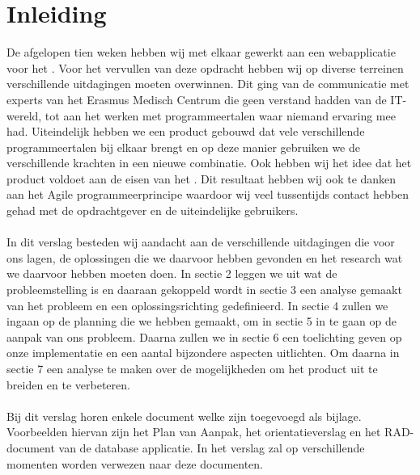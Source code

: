 \section{Inleiding}
\label{inleiding}
De afgelopen tien weken hebben wij met elkaar gewerkt aan een webapplicatie voor het \casamproject. 
Voor het vervullen van deze opdracht hebben wij op diverse terreinen verschillende uitdagingen moeten overwinnen. 
Dit ging van de communicatie met experts van het Erasmus Medisch Centrum die geen verstand hadden van de IT-wereld, tot aan het werken met programmeertalen waar niemand ervaring mee had. 
Uiteindelijk hebben we een product gebouwd dat vele verschillende programmeertalen bij elkaar brengt en op deze manier gebruiken we de verschillende krachten in een nieuwe combinatie. 
Ook hebben wij het idee dat het product voldoet aan de eisen van het \casamproject. 
Dit resultaat hebben wij ook te danken aan het Agile programmeerprincipe waardoor wij veel tussentijds contact hebben gehad met de opdrachtgever en de uiteindelijke gebruikers.
\\
\\
In dit verslag besteden wij aandacht aan de verschillende uitdagingen die voor ons lagen, de oplossingen die we daarvoor hebben gevonden en het research wat we daarvoor hebben moeten doen. 
In sectie 2 leggen we uit wat de probleemstelling is en daaraan gekoppeld wordt in sectie 3 een analyse gemaakt van het probleem en een oplossingsrichting gedefinieerd. 
In sectie 4 zullen we ingaan op de planning die we hebben gemaakt, om in sectie 5 in te gaan op de aanpak van ons probleem. 
Daarna zullen we in sectie 6 een toelichting geven op onze implementatie en een aantal bijzondere aspecten uitlichten. 
Om daarna in sectie 7 een analyse te maken over de mogelijkheden om het product uit te breiden en te verbeteren. 
\\
\\
Bij dit verslag horen enkele document welke zijn toegevoegd als bijlage. 
Voorbeelden hiervan zijn het Plan van Aanpak, het orientatieverslag en het RAD-document van de database applicatie. 
In het verslag zal op verschillende momenten worden verwezen naar deze documenten. 
